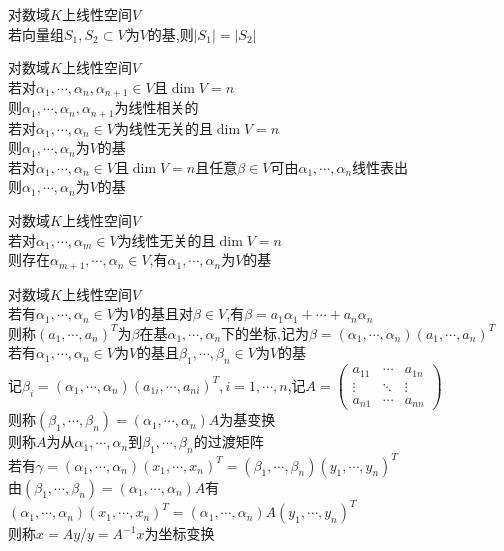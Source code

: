 \begin{dingli}
对数域$K$上线性空间$V$\\
若向量组$S_1,S_2\subset V$为$V$的基,则$|S_1|=|S_2|$
\end{dingli}

\begin{dingli}
对数域$K$上线性空间$V$\\
若对$\alpha_1,\cdots,\alpha_n,\alpha_{n+1}\in V$且$\dim V=n$\\
则$\alpha_1,\cdots,\alpha_n,\alpha_{n+1}$为线性相关的\\
若对$\alpha_1,\cdots,\alpha_n\in V$为线性无关的且$\dim V=n$\\
则$\alpha_1,\cdots,\alpha_n$为$V$的基\\
若对$\alpha_1,\cdots,\alpha_n\in V$且$\dim V=n$且任意$\beta\in V$可由$\alpha_1,\cdots,\alpha_n$线性表出\\
则$\alpha_1,\cdots,\alpha_n$为$V$的基
\end{dingli}

\begin{dingli}
对数域$K$上线性空间$V$\\
若对$\alpha_1,\cdots,\alpha_m\in V$为线性无关的且$\dim V=n$\\
则存在$\alpha_{m+1},\cdots,\alpha_{n}\in V$,有$\alpha_1,\cdots,\alpha_n$为$V$的基
\end{dingli}

\begin{dingyi}
对数域$K$上线性空间$V$\\
若有$\alpha_1,\cdots,\alpha_n\in V$为$V$的基且对$\beta\in V$,有$\beta=a_1\alpha_1+\cdots+a_n\alpha_n$\\
则称$(a_1,\cdots,a_n)^{T}$为$\beta$在基$\alpha_1,\cdots,\alpha_n$下的坐标,记为$\beta=(\alpha_1,\cdots,\alpha_n)(a_1,\cdots,a_n)^{T}$\\
若有$\alpha_1,\cdots,\alpha_n\in V$为$V$的基且$\beta_1,\cdots,\beta_n\in V$为$V$的基\\
记$\beta_i=(\alpha_1,\cdots,\alpha_n)(a_{1i},\cdots,a_{ni})^{T},i=1,\cdots,n$,记$A=\begin{pmatrix}a_{11}&\cdots&a_{1n}\\ \vdots&\ddots&\vdots\\ a_{n1}&\cdots&a_{nn}\end{pmatrix}$\\
则称$(\beta_1,\cdots,\beta_n)=(\alpha_1,\cdots,\alpha_n)A$为基变换\\
则称$A$为从$\alpha_1,\cdots,\alpha_n$到$\beta_1,\cdots,\beta_n$的过渡矩阵\\
若有$\gamma=(\alpha_1,\cdots,\alpha_n)(x_1,\cdots,x_n)^{T}=(\beta_1,\cdots,\beta_n)(y_1,\cdots,y_n)^{T}$\\
由$(\beta_1,\cdots,\beta_n)=(\alpha_1,\cdots,\alpha_n)A$有$(\alpha_1,\cdots,\alpha_n)(x_1,\cdots,x_n)^{T}=(\alpha_1,\cdots,\alpha_n)A(y_1,\cdots,y_n)^{T}$\\
则称$x=Ay$/$y=A^{-1}x$为坐标变换
\end{dingyi}

